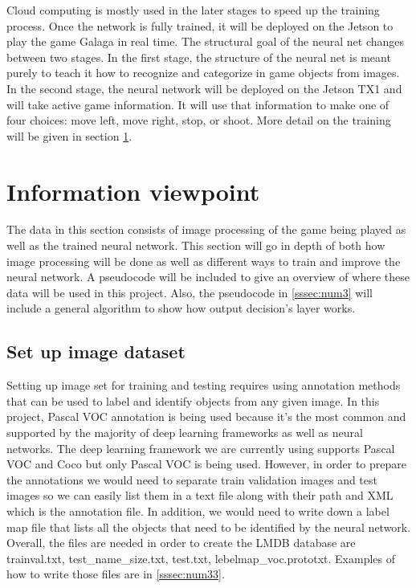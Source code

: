 \documentclass[onecolumn, draftclsnofoot,10pt, compsoc]{IEEEtran}
\begin{document}
Cloud computing is mostly used in the later stages to speed up the training process.
Once the network is fully trained, it will be deployed on the Jetson to play the game Galaga in real time.
\newline
\newline
The structural goal of the neural net changes between two stages.
In the first stage, the structure of the neural net is meant purely to teach it how to recognize and categorize in game objects from images.
In the second stage, the neural network will be deployed on the Jetson TX1 and will take active game information.
It will use that information to make one of four choices: move left, move right, stop, or shoot.
More detail on the training will be given in section \ref{sssec:num2}.

\section{Information viewpoint}\label{sssec:num2}%

The data in this section consists of image processing of the game being played as well as the trained neural network.
This section will go in depth of both how image processing will be done as well as different ways to train and improve the neural network.
A pseudocode will be included to give an overview of where these data will be used in this project.
Also, the pseudocode in \ref{sssec:num3} will include a general algorithm to show how output decision's layer works.

\subsection{Set up image dataset}%

Setting up image set for training and testing requires using annotation methods that can be used to label and identify objects from any given image.
In this project, Pascal VOC annotation is being used because it's the most common and supported by the majority of deep learning frameworks as well as neural networks.
The deep learning framework we are currently using supports Pascal VOC and Coco but only Pascal VOC is being used.
However, in order to prepare the annotations we would need to separate train validation images and test images so we can easily list them in a text file along with their path and XML which is the annotation file.
In addition, we would need to write down a label map file that lists all the objects that need to be identified by the neural network.
Overall, the files are needed in order to create the LMDB database are trainval.txt, test_name_size.txt, test.txt, lebelmap_voc.prototxt.
Examples of how to write those files are in \ref{sssec:num33}.
\end{document}
